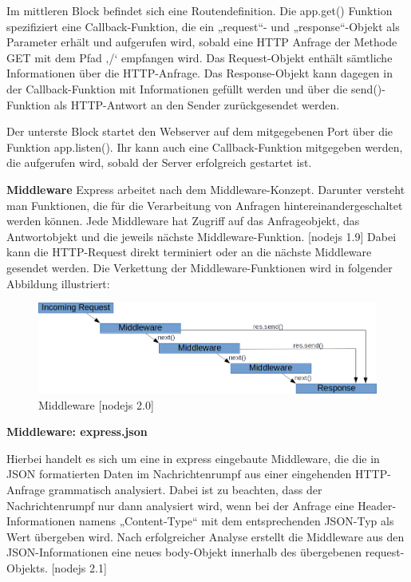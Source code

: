 Im mittleren Block befindet sich eine Routendefinition. Die app.get() Funktion spezifiziert eine Callback-Funktion, die ein „request“- und „response“-Objekt als Parameter erhält und aufgerufen wird, sobald eine HTTP Anfrage der Methode GET mit dem Pfad ‚/‘ empfangen wird. Das Request-Objekt enthält sämtliche Informationen über die HTTP-Anfrage. Das Response-Objekt kann dagegen in der Callback-Funktion mit Informationen gefüllt werden und über die send()-Funktion als HTTP-Antwort an den Sender zurückgesendet werden.\newline

Der unterste Block startet den Webserver auf dem mitgegebenen Port über die Funktion app.listen(). Ihr kann auch eine Callback-Funktion mitgegeben werden, die aufgerufen wird, sobald der Server erfolgreich gestartet ist.\newline
\newline

\newpage
\textbf{Middleware}
\newline
Express arbeitet nach dem Middleware-Konzept. Darunter versteht man Funktionen, die für die Verarbeitung von Anfragen hintereinandergeschaltet werden können. Jede Middleware hat Zugriff auf das Anfrageobjekt, das Antwortobjekt und die jeweils nächste Middleware-Funktion. [nodejs 1.9]
Dabei kann die HTTP-Request direkt terminiert oder an die nächste Middleware gesendet werden. Die Verkettung der Middleware-Funktionen wird in folgender Abbildung illustriert: \newline

\begin{figure}[h]
\centering
\includegraphics[width=12cm]{images/nodejs_middleware.png}
\caption{Middleware [nodejs 2.0]}
\end{figure}

\textbf{Middleware: express.json}
\newline

Hierbei handelt es sich um eine in express eingebaute Middleware, die die in JSON formatierten Daten im Nachrichtenrumpf aus einer eingehenden HTTP-Anfrage grammatisch analysiert.  Dabei ist zu beachten, dass der Nachrichtenrumpf nur dann analysiert wird, wenn bei der Anfrage eine Header-Informationen namens „Content-Type“ mit dem entsprechenden JSON-Typ als Wert übergeben wird. Nach erfolgreicher Analyse erstellt die Middleware aus den JSON-Informationen eine neues body-Objekt innerhalb des übergebenen request-Objekts. [nodejs 2.1]
\newline

